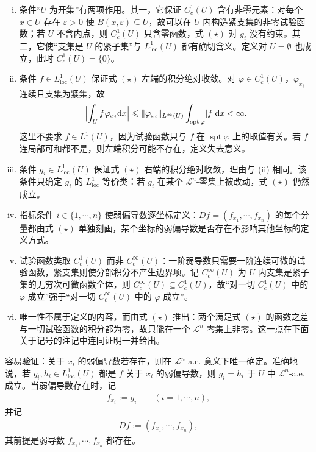 \documentclass[../../main.tex]{subfiles}%
\begin{document}
\begin{remark}\label{remark:ch04-def-4-1-条件}
\begin{enumerate}[(i)]
\item 条件“$U$ 为开集”有两项作用。其一，它保证 $C_c^{1}(U)$ 含有非零元素：对每个 $x\in U$ 存在 $\varepsilon>0$ 使 $B(x,\varepsilon)\subseteq U$，故可以在 $U$ 内构造紧支集的非零试验函数；若 $U$ 不含内点，则 $C_c^{1}(U)$ 只含零函数，式 $(\star)$ 对 $g_i$ 没有约束。其二，它使“支集是 $U$ 的紧子集”与 $L^{1}_{\mathrm{loc}}(U)$ 都有确切含义。定义对 $U=\emptyset$ 也成立，此时 $C_c^{1}(U)=\{0\}$。
\item 条件 $f\in L^{1}_{\mathrm{loc}}(U)$ 保证式 $(\star)$ 左端的积分绝对收敛。对 $\varphi\in C_c^{1}(U)$，$\varphi_{x_i}$ 连续且支集为紧集，故
\begin{align*}
\Bigl\lvert\int_{U}f\varphi_{x_i}\mathrm{d} x\Bigr\rvert\leqslant\lVert\varphi_{x_i}\rVert_{L^{\infty}(U)}\int_{\operatorname{spt}\varphi}\lvert f\rvert\mathrm{d} x<\infty .
\end{align*}
这里不要求 $f\in L^{1}(U)$，因为试验函数只与 $f$ 在 $\operatorname{spt}\varphi$ 上的取值有关。若 $f$ 连局部可和都不是，则左端积分可能不存在，定义失去意义。
\item 条件 $g_i\in L^{1}_{\mathrm{loc}}(U)$ 保证式 $(\star)$ 右端的积分绝对收敛，理由与 (ii) 相同。该条件只确定 $g_i$ 的 $L^{1}_{\mathrm{loc}}$ 等价类：若 $g_i$ 在某个 $\mathcal{L}^{n}$-零集上被改动，式 $(\star)$ 仍然成立。
\item 指标条件 $i\in\{1,\cdots,n\}$ 使弱偏导数逐坐标定义：$Df=(f_{x_1},\cdots,f_{x_n})$ 的每个分量都由式 $(\star)$ 单独刻画，某个坐标的弱偏导数是否存在不影响其他坐标的定义方式。
\item 试验函数类取 $C_c^{1}(U)$ 而非 $C_c^{\infty}(U)$：一阶弱导数只需要一阶连续可微的试验函数，紧支集则使分部积分不产生边界项。记 $C_c^{\infty}(U)$ 为 $U$ 内支集是紧子集的无穷次可微函数全体，则 $C_c^{\infty}(U)\subseteq C_c^{1}(U)$，故“对一切 $C_c^{1}(U)$ 中的 $\varphi$ 成立”强于“对一切 $C_c^{\infty}(U)$ 中的 $\varphi$ 成立”。
\item 唯一性不属于定义的内容，而由式 $(\star)$ 推出：两个满足式 $(\star)$ 的函数之差与一切试验函数的积分都为零，故只能在一个 $\mathcal{L}^{n}$-零集上非零。这一点在下面关于记号的注记中连同证明一并给出。
\end{enumerate}
\end{remark}

\begin{remark}\label{remark:ch04-def-4-1-弱导数}
容易验证：关于 $x_i$ 的弱偏导数若存在，则在 $\mathcal{L}^{n}$-a.e. 意义下唯一确定。准确地说，若 $g_i,h_i\in L^{1}_{\mathrm{loc}}(U)$ 都是 $f$ 关于 $x_i$ 的弱偏导数，则 $g_i=h_i$ 于 $U$ 中 $\mathcal{L}^{n}$-a.e. 成立。当弱偏导数存在时，记
\begin{align*}
f_{x_i}:=g_i\qquad(i=1,\cdots,n),
\end{align*}
并记
\begin{align*}
Df:=(f_{x_1},\cdots,f_{x_n}),
\end{align*}
其前提是弱导数 $f_{x_1},\cdots,f_{x_n}$ 都存在。
\end{remark}
\end{document}

